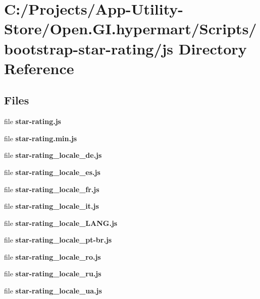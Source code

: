 \section{C\+:/\+Projects/\+App-\/\+Utility-\/\+Store/\+Open.G\+I.\+hypermart/\+Scripts/bootstrap-\/star-\/rating/js Directory Reference}
\label{dir_e83eb1c465ea97f216810b7d0b04491f}
\subsection*{Files}
\begin{DoxyCompactItemize}
\item 
file \textbf{ star-\/rating.\+js}
\item 
file \textbf{ star-\/rating.\+min.\+js}
\item 
file \textbf{ star-\/rating\+\_\+locale\+\_\+de.\+js}
\item 
file \textbf{ star-\/rating\+\_\+locale\+\_\+es.\+js}
\item 
file \textbf{ star-\/rating\+\_\+locale\+\_\+fr.\+js}
\item 
file \textbf{ star-\/rating\+\_\+locale\+\_\+it.\+js}
\item 
file \textbf{ star-\/rating\+\_\+locale\+\_\+\+L\+A\+N\+G.\+js}
\item 
file \textbf{ star-\/rating\+\_\+locale\+\_\+pt-\/br.\+js}
\item 
file \textbf{ star-\/rating\+\_\+locale\+\_\+ro.\+js}
\item 
file \textbf{ star-\/rating\+\_\+locale\+\_\+ru.\+js}
\item 
file \textbf{ star-\/rating\+\_\+locale\+\_\+ua.\+js}
\end{DoxyCompactItemize}

